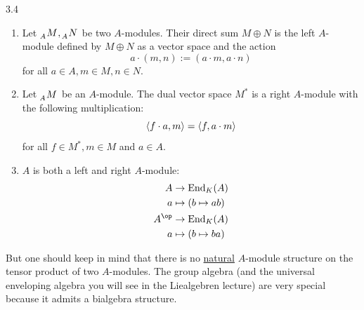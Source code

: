 \documentclass[twoside = false,	%
		headsepline,		%
		parskip = true,
		]{scrbook}						%
\begin{document}
        \begin{example}{}{3.4}
            \begin{enumerate}
                \item
                    Let $\tensor[_A]{M}{}, \tensor[_A]{N}{}$ be two $A$-modules. Their direct sum $M \oplus N$ is the left $A$-module defined by $M \oplus N$ as a vector space and the action
                    \begin{equation*}
                        a\cdot(m,n):=(a \cdot m, a \cdot n)
                    \end{equation*}
                    for all $a \in A, m \in M, n\in N$.
                \item
                    Let $\tensor[_A]{M}{}$ be an $A$-module. The dual vector space $M^*$ is a right $A$-module with the following multiplication:
                    \begin{equation*}
                        \left\langle f\cdot a, m\right\rangle = \left\langle f,a \cdot m\right\rangle
                    \end{equation*}
                    for all $f \in M^*, m \in M$ and $a \in A$.
                \item
                    $A$ is both a left and right $A$-module:
                    \begin{equation*}
                    \begin{split}
                        A &\to \End_K(A) \\
                        a &\mapsto (b \mapsto ab) \\
                        A^\op &\to \End_K(A) \\
                            a &\mapsto (b \mapsto ba)
                    \end{split}
                    \end{equation*}
            \end{enumerate}
        \end{example}
        But one should keep in mind that there is no \underline{natural} $A$-module structure on the tensor product of two $A$-modules. The group algebra (and the universal enveloping algebra you will see in the Liealgebren lecture) are very special because it admits a bialgebra structure.

\end{document}
